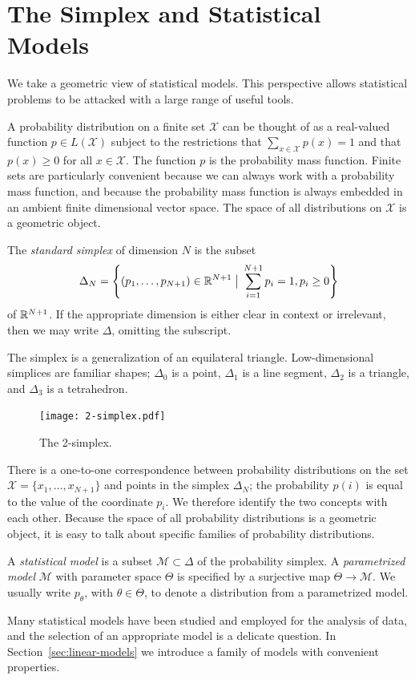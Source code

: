 \documentclass[cclicense]{hmcthesis}
\providecommand*{\xs}{\mathcal X}
\providecommand*{\ms}{\mathcal M}
\newcommand*{\vbar}{\;\big\vert\;}
\numberwithin{equation}{chapter}
\numberwithin{thmcounter}{chapter}
\begin{document}
    \section{The Simplex and Statistical Models}

    We take a geometric view of statistical models.  This perspective allows
    statistical problems to be attacked with a large range of useful tools.

    A probability distribution on a finite set $\xs$ can be thought of as a
    real-valued function $p \in L(\xs)$ subject to the restrictions that
    $\sum_{x\in \xs} p(x) = 1$ and that $p(x) \ge 0$ for all $x \in \xs$.  The
    function $p$ is the probability mass function.  Finite sets are particularly
    convenient because we can always work with a probability mass function, and
    because the probability mass function is always embedded in an ambient
    finite dimensional vector space.  The space of all distributions on $\xs$ is
    a geometric object.
    
    \begin{definition} 
        The \emph{standard simplex} of dimension $N$ is the subset
        \[
            \Delta_N = 
            \left\{(p_1, \ldots, p_{N+1}) \in \R^{N+1} \vbar 
            \sum_{i=1}^{N+1} p_i= 1, p_i \ge 0 \right\} 
        \]
        of $\mathbb{R}^{N+1}$.  If the appropriate dimension is either clear in context
        or irrelevant, then we may write $\Delta$, omitting the subscript.
    \end{definition}

    The simplex is a generalization of an equilateral triangle.  Low-dimensional
    simplices are familiar shapes; $\Delta_0$ is a point, $\Delta_1$ is a line
    segment, $\Delta_2$ is a triangle, and $\Delta_3$ is a tetrahedron.
    \begin{figure}[H]
        \centering
        \texttt{[image: 2-simplex.pdf]}
        \caption{The 2-simplex.}
    \end{figure}
    There is a one-to-one correspondence between probability distributions on
    the set $\xs = \{x_1, \ldots, x_{N+1}\}$ and points in the simplex
    $\Delta_N$; the probability $p(i)$ is equal to the value of the coordinate
    $p_i$.  We therefore identify the two concepts with each other.
    Because the space of all probability distributions is a geometric
    object, it is easy to talk about specific families of probability
    distributions.
    \begin{definition}
    A \emph{statistical model} is a subset $\ms \subset \Delta$ of the
    probability simplex.  A \emph{parametrized model} $\ms$ with parameter space
    $\Theta$ is specified by a surjective map $\Theta \to \ms$.  We usually
    write $p_\theta$, with $\theta \in \Theta$, to denote a distribution from a
    parametrized model.
    \end{definition}
    Many statistical models have been studied and employed for the analysis of
    data, and the selection of an appropriate model is a delicate question.  In
    Section~\ref{sec:linear-models} we introduce a family of models with
    convenient properties.
\end{document}
